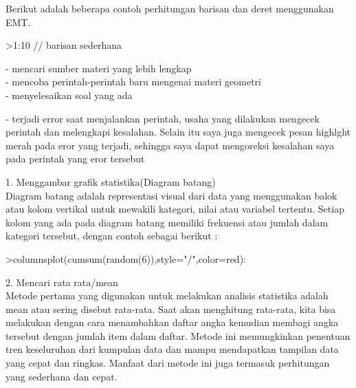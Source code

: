 \documentclass[a4paper,10pt]{article}
\begin{document}
\begin{eulernotebook}
\begin{eulercomment}
\begin{eulercomment}
\begin{eulercomment}
Berikut adalah beberapa contoh perhitungan barisan dan deret
menggunakan EMT.
\end{eulercomment}
\begin{eulerprompt}
>1:10 // barisan sederhana
\end{eulerprompt}
\begin{euleroutput}
  [1,  2,  3,  4,  5,  6,  7,  8,  9,  10]
\end{euleroutput}
\begin{eulercomment}
- mencari sumber materi yang lebih lengkap\\
- mencoba perintah-perintah baru mengenai materi geometri\\
- menyelesaikan soal yang ada

\end{eulercomment}
\begin{eulercomment}
- terjadi error saat menjalankan perintah, usaha yang dilakukan mengecek perintah dan
melengkapi kesalahan. Selain itu saya juga mengecek pesan highlght merah pada eror yang
terjadi, sehingga saya dapat mengoreksi kesalahan saya pada perintah yang eror tersebut
\end{eulercomment}
\begin{eulercomment}

\end{eulercomment}
\eulersubheading{}
\eulersubheading{}
\begin{eulercomment}
1. Menggambar grafik statistika(Diagram batang)\\
Diagram batang adalah representasi visual dari data yang menggunakan balok atau kolom
vertikal untuk mewakili kategori, nilai atau variabel tertentu. Setiap kolom yang ada pada
diagram  batang memiliki frekuensi atau jumlah dalam kategori tersebut, dengan contoh sebagai
berikut :
\end{eulercomment}
\begin{eulerprompt}
>columnsplot(cumsum(random(6)),style="/",color=red):
\end{eulerprompt}
\begin{eulercomment}
2. Mencari rata rata/mean\\
Metode pertama yang digunakan untuk melakukan analisis statistika
adalah mean atau sering disebut rata-rata. Saat akan menghitung
rata-rata, kita bisa melakukan dengan cara menambahkan daftar angka
kemudian membagi angka tersebut dengan jumlah item dalam daftar.
Metode ini memungkinkan penentuan tren keseluruhan dari kumpulan data
dan mampu mendapatkan tampilan data yang cepat dan ringkas. Manfaat
dari metode ini juga termasuk perhitungan yang sederhana dan cepat.


\end{eulercomment}
\end{eulercomment}
\end{eulercomment}
\end{eulernotebook}
\end{document}

